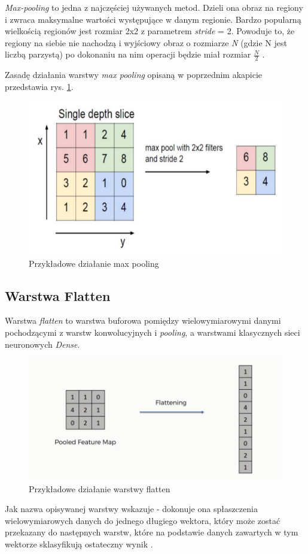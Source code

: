 \documentclass[a4paper,12pt,oneside]{book} %
\begin{document}
\emph{Max-pooling} to jedna z najczęściej używanych metod. Dzieli ona obraz na regiony i zwraca maksymalne wartości występujące w danym regionie. Bardzo popularną wielkością regionów jest rozmiar 2x2 z parametrem \emph{stride} = 2. Powoduje to, że regiony na siebie nie nachodzą i wyjściowy obraz o rozmiarze \emph{N} (gdzie N jest liczbą parzystą) po dokonaniu na nim operacji będzie miał rozmiar $\frac{N}{2}$ \cite{8308186}.

Zasadę działania warstwy \emph{max pooling} opisaną w poprzednim akapicie przedstawia rys. \ref{max_pooling}.

\begin{figure}[h]
	\centering
	\includegraphics[scale=0.6]{max_pooling.png}
	\caption{Przykładowe działanie max pooling \cite{8308186}}
	\label{max_pooling}
\end{figure}

\subsection{Warstwa Flatten}
\label{flat}

Warstwa \emph{flatten} to warstwa buforowa pomiędzy wielowymiarowymi danymi pochodzącymi z warstw konwolucyjnych i \emph{pooling}, a warstwami klasycznych sieci neuronowych \emph{Dense}. 
\begin{figure}[h]
	\centering
	\includegraphics[scale=0.6]{flatten.png}
	\caption{Przykładowe działanie warstwy flatten \cite{superddflatten}}
	\label{flatten}
\end{figure}
Jak nazwa opisywanej warstwy wskazuje - dokonuje ona spłaszczenia wielowymiarowych danych do jednego długiego wektora, który może zostać przekazany do następnych warstw, które na podstawie danych zawartych w tym wektorze sklasyfikują ostateczny wynik \cite{superddflatten}.
\end{document}
